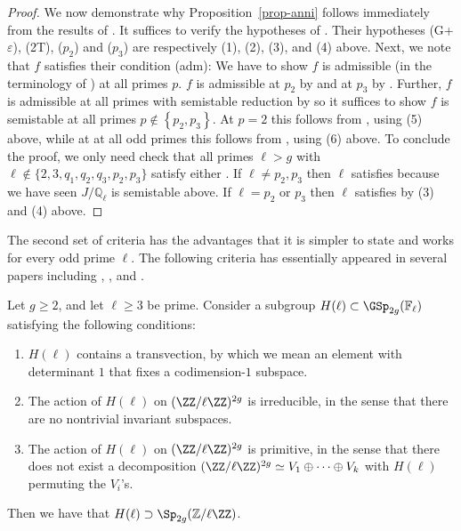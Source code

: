 \begin{proof}
	We now demonstrate why Proposition~\ref{prop-anni} follows immediately from the results of \cite{anni2017constructing}.
	It suffices to verify the hypotheses of \cite[Theorem 6.2]{anni2017constructing}.
	Their hypotheses (G+$\varepsilon$), (2T), ($p_2$) and ($p_3$) are respectively (1), (2), (3), and (4) above.
	Next, we note that $f$ satisfies their condition (adm):
	We have to show $f$ is admissible (in the terminology of
	\cite[Definition 4.6]{anni2017constructing}) at all primes $p$.
	$f$ is admissible at $p_2$ by \cite[Lemma 4.10]{anni2017constructing} and at $p_3$ by \cite[Lemma 4.11]{anni2017constructing}.
	Further, $f$ is admissible at all primes with semistable reduction by \cite[Lemma 4.9]{anni2017constructing}
	so it suffices to show $f$ is semistable at all primes $p \notin \left\{ p_2, p_3 \right\}$.
	At $p = 2$ this follows from \cite[Lemma 7.7]{anni2017constructing}, using (5) above, while at
	at all odd primes this follows from \cite[Lemma 7.7]{anni2017constructing}, using (6) above.
	To conclude the proof, we only need check that all primes $\ell > g$ with $\ell \not\in \{2,3,q_1, q_2, q_3, p_2, p_3\}$
	satisfy either \cite[Theorem 6.2(i) or (iii)]{anni2017constructing}.
	If $\ell \neq p_2, p_3$ then $\ell$ satisfies \cite[Theorem 6.2(i)]{anni2017constructing} because we have seen $J/\mathbb Q_\ell$
	is semistable above. If $\ell = p_2$ or $p_3$ then $\ell$ satisfies \cite[Theorem 6.2(iii)]{anni2017constructing} by (3) and (4) above.
\end{proof}


The second set of criteria has the advantages that it is simpler to state and works for every odd prime $\ell$.
The following criteria has essentially appeared in several papers including
\cite[Theorem 1.1]{renyaDW:classification-of-subgroups-of-symplectic-groups-over-finite-fields}, \cite[Theorem 1.1]{hall:big-symplectic-or-orthogonal-monodromy-modulo-l}, and \cite[Proposition 2.2]{seaweed}.
\begin{proposition}
	\label{proposition:zywina-criterion}
	Let $g \ge 2$, and let $\ell \ge 3$ be prime. Consider a subgroup $H(\ell) \subset \GSp_{2g}(\mathbb{F}_\ell)$ satisfying the following conditions: 
	\begin{enumerate}
		\item[\customlabel{propa}{(A)}] $H(\ell)$ contains a transvection, by which we mean an element with determinant $1$ that fixes a codimension-$1$ subspace.%
	\item[\customlabel{propb}{(B)}] The action of $H(\ell)$ on $(\ZZ/\ell \ZZ)^{2g}$ is irreducible, in the sense that there are no nontrivial invariant subspaces.
\item[\customlabel{propc}{(C)}] The action of $H(\ell)$ on $(\ZZ / \ell \ZZ)^{2g}$ is primitive, in the sense that there does not exist a decomposition $(\ZZ / \ell \ZZ)^{2g} \simeq V_1 \oplus \dots \oplus V_k$ with $H(\ell)$ permuting the $V_i$'s.
	\end{enumerate}
	Then we have that $H(\ell) \supset \Sp_{2g}(\mathbb{Z} / \ell \ZZ)$. 
\end{proposition}



